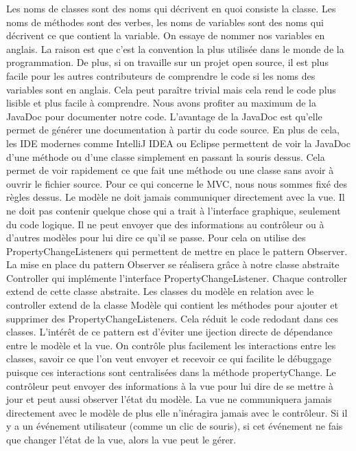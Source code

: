 \documentclass{article}
\begin{document}
    Les noms de classes sont des noms qui décrivent en quoi consiste la classe.
    Les noms de méthodes sont des verbes, les noms de variables sont des noms qui décrivent ce que contient la variable.
    On essaye de nommer nos variables en anglais. La raison est que c'est la convention la plus utilisée dans le monde de la programmation.
    De plus, si on travaille sur un projet open source, il est plus facile pour les autres contributeurs de comprendre le code si les noms des variables sont en anglais.
    Cela peut paraître trivial mais cela rend le code plus lisible et plus facile à comprendre.
    Nous avons profiter au maximum de la JavaDoc pour documenter notre code.
    L'avantage de la JavaDoc est qu'elle permet de générer une documentation à partir du code source.
    En plus de cela, les IDE modernes comme IntelliJ IDEA ou Eclipse permettent de voir la JavaDoc d'une méthode ou d'une classe simplement en passant la souris dessus.
    Cela permet de voir rapidement ce que fait une méthode ou une classe sans avoir à ouvrir le fichier source.
    \newline
    Pour ce qui concerne le MVC, nous nous sommes fixé des règles dessus.
    Le modèle ne doit jamais communiquer directement avec la vue.
    Il ne doit pas contenir quelque chose qui a trait à l'interface graphique, seulement du code logique.
    Il ne peut envoyer que des informations au contrôleur ou à d'autres modèles pour lui dire ce qu'il se passe.
    Pour cela on utilise des PropertyChangeListeners qui permettent de mettre en place le pattern Observer.
    La mise en place du pattern Observer se réalisera grâce à notre classe abstraite Controller qui implémente l'interface PropertyChangeListener.
    Chaque controller extend de cette classe abstraite. Les classes du modèle en relation avec le controller extend de la classe Modèle qui contient les méthodes pour ajouter et supprimer des PropertyChangeListeners.
    Cela réduit le code redodant dans ces classes. L'intérêt de ce pattern est d'éviter une ijection directe de dépendance entre le modèle et la vue.
    On contrôle plus facilement les interactions entre les classes, savoir ce que l'on veut envoyer et recevoir ce qui facilite le débuggage puisque ces interactions sont centralisées dans la méthode propertyChange.
    Le contrôleur peut envoyer des informations à la vue pour lui dire de se mettre à jour et peut aussi observer l'état du modèle.
    La vue ne communiquera jamais directement avec le modèle de plus elle n'inéragira jamais avec le contrôleur.
    Si il y a un événement utilisateur (comme un clic de souris), si cet événement ne fais que changer l'état de la vue, alors la vue peut le gérer.
\end{document}
